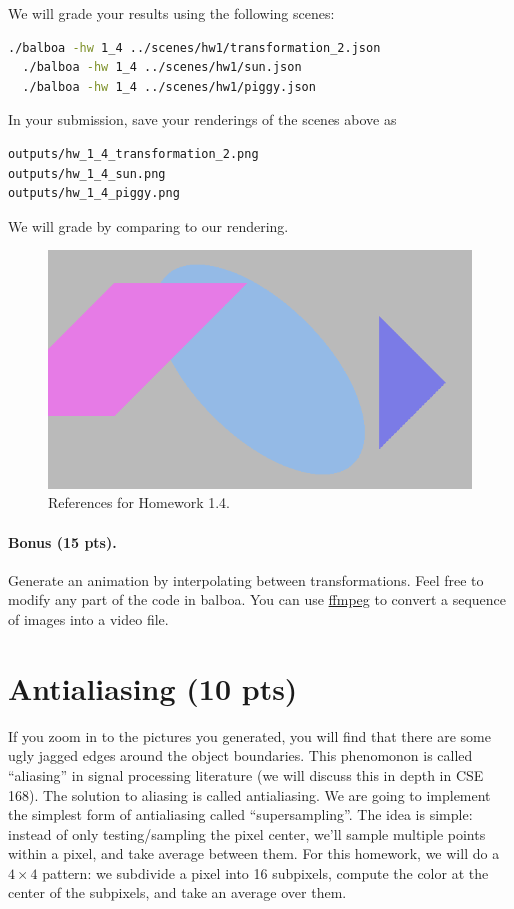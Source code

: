 We will grade your results using the following scenes:
\begin{lstlisting}[language=bash]
  ./balboa -hw 1_4 ../scenes/hw1/transformation_2.json
  ./balboa -hw 1_4 ../scenes/hw1/sun.json
  ./balboa -hw 1_4 ../scenes/hw1/piggy.json
\end{lstlisting}
In your submission, save your renderings of the scenes above as
\begin{lstlisting}[language=bash]
outputs/hw_1_4_transformation_2.png
outputs/hw_1_4_sun.png
outputs/hw_1_4_piggy.png
\end{lstlisting}
We will grade by comparing to our rendering.

\begin{figure}[ht]
    \centering
    \includegraphics[width=0.5\linewidth]{imgs/hw_1_4.png}
    \caption{References for Homework 1.4.}
    \label{fig:hw1_4}
\end{figure}

\paragraph{Bonus (15 pts).} Generate an animation by interpolating between transformations. Feel free to modify any part of the code in balboa. You can use \href{https://trac.ffmpeg.org/wiki/Slideshow}{ffmpeg} to convert a sequence of images into a video file.

\section{Antialiasing (10 pts)}
If you zoom in to the pictures you generated, you will find that there are some ugly jagged edges around the object boundaries. This phenomonon is called ``aliasing'' in signal processing literature (we will discuss this in depth in CSE 168). The solution to aliasing is called antialiasing. We are going to implement the simplest form of antialiasing called ``supersampling''. The idea is simple: instead of only testing/sampling the pixel center, we'll sample multiple points within a pixel, and take average between them. For this homework, we will do a $4\times4$ pattern: we subdivide a pixel into 16 subpixels, compute the color at the center of the subpixels, and take an average over them.


